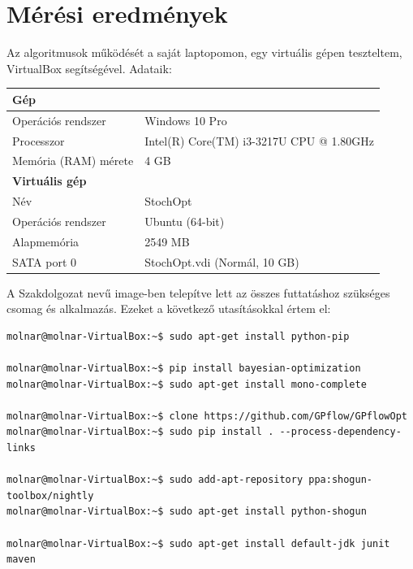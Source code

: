 \chapter{Mérési eredmények}
\label{sec:meresek}
Az algoritmusok működését a saját laptopomon, egy virtuális gépen teszteltem, VirtualBox segítségével. Adataik:\\
\begin{center}
	\begin{tabular}{ll}
		\hline
		\textbf{Gép} & \\
		\hline
		Operációs rendszer & Windows 10 Pro\\
		Processzor & Intel(R) Core(TM) i3-3217U CPU @ 1.80GHz\\
		Memória (RAM) mérete & 4 GB\\
		\hline
		\textbf{Virtuális gép} & \\
		\hline
		Név & StochOpt\\
		Operációs rendszer & Ubuntu (64-bit)\\
		Alapmemória & 2549 MB\\
		SATA port 0 & StochOpt.vdi (Normál, 10 GB)
	\end{tabular}
\end{center}

A Szakdolgozat nevű image-ben telepítve lett az összes futtatáshoz szükséges csomag és alkalmazás. Ezeket a következő utasításokkal értem el:
\begin{lstlisting}
molnar@molnar-VirtualBox:~$ sudo apt-get install python-pip

molnar@molnar-VirtualBox:~$ pip install bayesian-optimization
molnar@molnar-VirtualBox:~$ sudo apt-get install mono-complete

molnar@molnar-VirtualBox:~$ clone https://github.com/GPflow/GPflowOpt
molnar@molnar-VirtualBox:~$ sudo pip install . --process-dependency-links

molnar@molnar-VirtualBox:~$ sudo add-apt-repository ppa:shogun-toolbox/nightly
molnar@molnar-VirtualBox:~$ sudo apt-get install python-shogun

molnar@molnar-VirtualBox:~$ sudo apt-get install default-jdk junit maven
\end{lstlisting}

